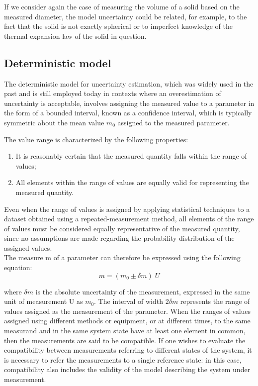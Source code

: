 \documentclass[../main.tex]{subfiles}
\begin{document}
If we consider again the case of measuring the volume of a solid based on the measured diameter, the model uncertainty could be related, for example, to the fact that the solid is not exactly spherical or to imperfect knowledge of the thermal expansion law of the solid in question.

\subsection{Deterministic model}

The deterministic model for uncertainty estimation, which was widely used in the past and is still employed today in contexts where an overestimation of uncertainty is acceptable, involves assigning the measured value to a parameter in the form of a bounded interval, known as a confidence interval, which is typically symmetric about the mean value $m_0$ assigned to the measured parameter. 

The value range is characterized by the following properties:

\begin{enumerate}
	\item[\textbf{-}] It is reasonably certain that the measured quantity falls within the range of values;
	\item[\textbf{-}] All elements within the range of values are equally valid for representing the measured quantity.
\end{enumerate}

Even when the range of values is assigned by applying statistical techniques to a dataset obtained using a repeated-measurement method, all elements of the range of values must be considered equally representative of the measured quantity, since no assumptions are made regarding the probability distribution of the assigned values.\\

The measure m of a parameter can therefore be expressed using the following equation:\\

\begin{equation}
	m = (m_0 \pm \delta m)\; \unit{U} 
\end{equation}

where $\delta m$ is the absolute uncertainty of the measurement, expressed in the same unit of measurement U as $m_0$. The interval of width $2\delta m$ represents the range of values assigned as the measurement of the parameter.
When the ranges of values assigned using different methods or equipment, or at different times, to the same measurand and in the same system state have at least one element in common, then the measurements are said to be compatible. 
If one wishes to evaluate the compatibility between measurements referring to different states of the system, it is necessary to refer the measurements to a single reference state: in this case, compatibility also includes  the validity of the model describing the system under measurement.
\end{document}
